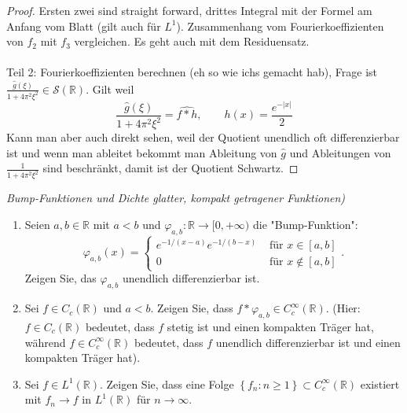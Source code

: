\documentclass[11pt]{article}
\newcommand{\R}{\mathbb{R}}
\newenvironment{problem}[2][Beispiel]{
    \begin{trivlist}
        \item[\hskip \labelsep {\bfseries #1}\hskip \labelsep {\bfseries #2.}] \itshape}{
    \end{trivlist}\normalshape
}
\begin{document}
    \begin{proof}
        Ersten zwei sind straight forward, drittes Integral mit der Formel am
        Anfang vom Blatt (gilt auch für $L^1$). Zusammenhang vom
        Fourierkoeffizienten von $f_2$ mit $f_3$ vergleichen. Es geht auch
        mit dem Residuensatz. \\\\
        Teil 2: Fourierkoeffizienten berechnen (eh so wie ichs gemacht hab),
        Frage ist $\frac{\hat{g}(\xi)}{1+4\pi^2 \xi^2}\in\mathcal{S}(\R)$.
        Gilt weil
        $$\frac{\hat{g}(\xi)}{1+4\pi^2 \xi^2} = \widehat{f * h}, \qquad
        h(x) = \frac{e^{-|x|}}{2}$$
        Kann man aber auch direkt sehen, weil der Quotient unendlich oft
        differenzierbar ist und wenn man ableitet bekommt man Ableitung von
        $\hat{g}$ und Ableitungen von $\frac{1}{1+4\pi^2 \xi^2}$ sind
        beschränkt, damit ist der Quotient Schwartz.
    \end{proof}

    \begin{problem}{3}
        (Bump-Funktionen und Dichte glatter, kompakt getragener Funktionen)
        \begin{enumerate}[label = (\roman{enumi})]
            \item Seien $a, b \in \mathbb{R}$ mit $a<b$ und $\varphi_{a, b}:
            \mathbb{R} \rightarrow[0,+\infty)$ die "Bump-Funktion":
            $$
            \varphi_{a, b}(x)=\left\{\begin{array}{ll}
                                         e^{-1 /(x-a)} e^{-1 /(b-x)} & \text { für } x
                                         \in[a, b] \\
                                         0 & \text { für } x \notin[a, b]
            \end{array} .\right.
            $$
            Zeigen Sie, das $\varphi_{a, b}$ unendlich differenzierbar ist.
            \item Sei $f \in C_c(\mathbb{R})$ und $a<b$. Zeigen Sie, dass $f *
            \varphi_{a, b} \in C_c^{\infty}(\mathbb{R})$.
            (Hier: $f \in C_c(\mathbb{R})$ bedeutet, dass $f$ stetig ist und einen
            kompakten Träger hat, während $f \in C_c^{\infty}(\mathbb{R})$ bedeutet,
            dass $f$ unendlich differenzierbar ist und einen kompakten Träger hat).
            \item Sei $f \in L^1(\mathbb{R})$. Zeigen Sie, dass eine Folge
            $\left\{f_n: n \geq 1\right\} \subset C_c^{\infty}(\mathbb{R})$ existiert
            mit $f_n \rightarrow f$ in $L^1(\mathbb{R})$ für $n \rightarrow \infty$.
        \end{enumerate}
    \end{problem}
\end{document}
